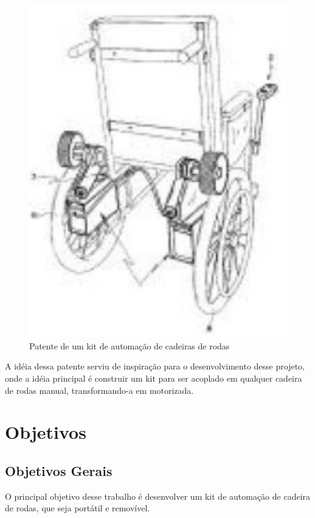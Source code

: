 \begin{figure}[!htb]
  \centering
  \includegraphics[keepaspectratio=true,scale=0.50]{figuras/introducao/kit_motorizacao}
  \caption{Patente de um kit de automação de cadeiras de rodas}
  \label{fig:kit_motorizacao}
\end{figure}

A idéia dessa patente serviu de inspiração para o desenvolvimento desse projeto, onde a idéia principal é construir um kit para ser acoplado em qualquer cadeira de rodas manual, transformando-a em motorizada.

\section{Objetivos}
\subsection{Objetivos Gerais}

O principal objetivo desse trabalho é desenvolver um kit de automação de cadeira de rodas, que seja portátil e removível.

